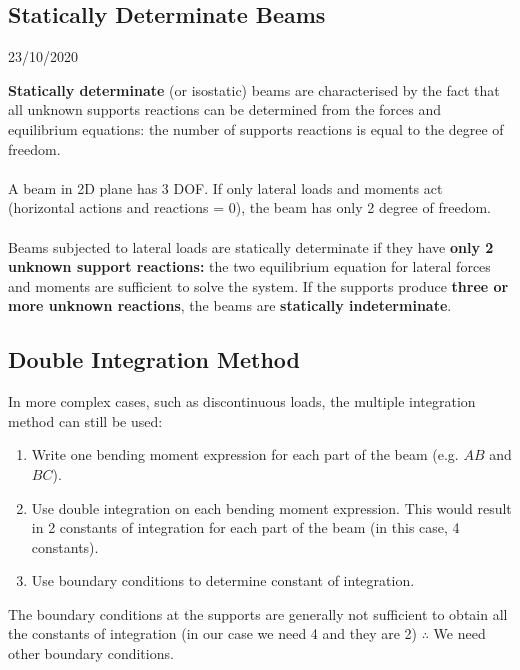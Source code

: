 \documentclass[class=report, crop=false, 12pt,a4paper]{standalone}
\begin{document}
\subsection{Statically Determinate Beams}
\begin{center}
  23/10/2020
\end{center}
\textbf{Statically determinate} (or isostatic) beams are characterised by the fact that all unknown supports reactions can be determined from the forces and equilibrium equations: the number of supports reactions is equal to the degree of freedom. \\\\
A beam in 2D plane has 3 DOF. If only lateral loads and moments act (horizontal actions and reactions = 0), the beam has only 2 degree of freedom. \\\\
Beams subjected to lateral loads are statically determinate if they have \textbf{only 2 unknown support reactions:} the two equilibrium equation for lateral forces and moments are sufficient to solve the system. If the supports produce \textbf{three or more unknown reactions}, the beams are \textbf{statically indeterminate}.
\subsection{Double Integration Method}
In more complex cases, such as discontinuous loads, the multiple integration method can still be used:
\begin{enumerate}
  \item Write one bending moment expression for each part of the beam (e.g. $AB$ and $BC$).
  \item Use double integration on each bending moment expression. This would result in 2 constants of integration for each part of the beam (in this case, 4 constants).
  \item Use boundary conditions to determine constant of integration.
\end{enumerate}
The boundary conditions at the supports are generally not sufficient to obtain all the constants of integration (in our case we need 4 and they are 2) $\therefore$ We need other boundary conditions.
\end{document}
